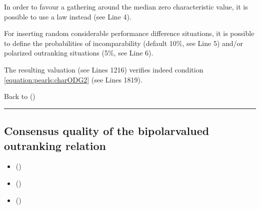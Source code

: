\documentclass[a4paper,12pt,english]{sphinxhowto}
\begin{document}
\sphinxAtStartPar
In order to favour a gathering around the median zero characteristic value, it is possible to use a  law instead (see Line 4).

\sphinxAtStartPar
For inserting random considerable performance difference situations, it is possible to define the probabilities of incomparability (default 10\%, see Line 5) and/or polarized outranking situations (5\%, see Line 6).

\sphinxAtStartPar
The resulting valuation (see Lines 12\sphinxhyphen{}16) verifies indeed condition \eqref{equation:pearls:charODG2} (see Lines 18\sphinxhyphen{}19).

\sphinxAtStartPar
Back to {\hyperref[\detokenize{pearls:pearls-label}]{}} ()


\bigskip\hrule\bigskip



\subsection{Consensus quality of the bipolar\sphinxhyphen{}valued outranking relation}
\label{\detokenize{pearls:consensus-quality-of-the-bipolar-valued-outranking-relation}}\label{\detokenize{pearls:outranking-consensus-tutorial-label}}
\begin{sphinxcontents}
\begin{itemize}
\item {} 
\sphinxAtStartPar
{}\label{\detokenize{pearls:id210}}{\hyperref[\detokenize{pearls:circular-performance-tableaux}]{}} ()

\item {} 
\sphinxAtStartPar
{}\label{\detokenize{pearls:id211}}{\hyperref[\detokenize{pearls:a-difficult-decision-problem}]{}} ()

\item {} 
\sphinxAtStartPar
{}\label{\detokenize{pearls:id212}}{\hyperref[\detokenize{pearls:the-central-condorcet-point-of-view}]{}} ()

\end{itemize}
\end{sphinxcontents}
\end{document}
